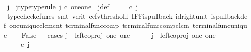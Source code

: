 \begin{isabellebody}
\ j\ \ j{\isacharunderscore}{\kern0pt}type{\isacharbrackleft}{\kern0pt}type{\isacharunderscore}{\kern0pt}rule{\isacharbrackright}{\kern0pt}{\isacharcolon}{\kern0pt}\ {\isachardoublequoteopen}j\ {\isasymin}\isactrlsub c\ one{\isasymCoprod}one{\isachardoublequoteclose}\ \ j{\isacharunderscore}{\kern0pt}def{\isacharcolon}{\kern0pt}\ \ {\isachardoublequoteopen}{\isacharparenleft}{\kern0pt}{\isasymlangle}{\isasymt}{\isacharcomma}{\kern0pt}\ {\isasymt}{\isasymrangle}\ {\isasymamalg}{\isasymlangle}{\isasymf}{\isacharcomma}{\kern0pt}\ {\isasymf}{\isasymrangle}{\isacharparenright}{\kern0pt}\ {\isasymcirc}\isactrlsub c\ j\ \ {\isacharequal}{\kern0pt}\ {\isasymlangle}{\isasymf}{\isacharcomma}{\kern0pt}{\isasymt}{\isasymrangle}{\isachardoublequoteclose}\isanewline
\ \ \ \ \isamarkupfalse%
\ {\isacharparenleft}{\kern0pt}typecheck{\isacharunderscore}{\kern0pt}cfuncs{\isacharcomma}{\kern0pt}\ smt\ {\isacharparenleft}{\kern0pt}verit{\isacharcomma}{\kern0pt}\ ccfv{\isacharunderscore}{\kern0pt}threshold{\isacharparenright}{\kern0pt}\ IFF{\isacharunderscore}{\kern0pt}is{\isacharunderscore}{\kern0pt}pullback\ id{\isacharunderscore}{\kern0pt}right{\isacharunderscore}{\kern0pt}unit{}\ is{\isacharunderscore}{\kern0pt}pullback{\isacharunderscore}{\kern0pt}def\ one{\isacharunderscore}{\kern0pt}unique{\isacharunderscore}{\kern0pt}element\ terminal{\isacharunderscore}{\kern0pt}func{\isacharunderscore}{\kern0pt}comp\ terminal{\isacharunderscore}{\kern0pt}func{\isacharunderscore}{\kern0pt}comp{\isacharunderscore}{\kern0pt}elem\ terminal{\isacharunderscore}{\kern0pt}func{\isacharunderscore}{\kern0pt}unique{\isacharparenright}{\kern0pt}\isanewline
\ \ \isamarkupfalse%
\ False\isanewline
\ \ \isamarkupfalse%
{\isacharparenleft}{\kern0pt}cases\ {\isachardoublequoteopen}j\ {\isacharequal}{\kern0pt}\ left{\isacharunderscore}{\kern0pt}coproj\ one\ one{\isachardoublequoteclose}{\isacharparenright}{\kern0pt}\isanewline
\ \ \ \ \isamarkupfalse%
\ {\isachardoublequoteopen}j\ {\isacharequal}{\kern0pt}\ left{\isacharunderscore}{\kern0pt}coproj\ one\ one{\isachardoublequoteclose}\isanewline
\ \ \ \ \isamarkupfalse%
\ \isamarkupfalse%
\ {\isachardoublequoteopen}{\isacharparenleft}{\kern0pt}{\isasymlangle}{\isasymt}{\isacharcomma}{\kern0pt}\ {\isasymt}{\isasymrangle}\ {\isasymamalg}{\isasymlangle}{\isasymf}{\isacharcomma}{\kern0pt}\ {\isasymf}{\isasymrangle}{\isacharparenright}{\kern0pt}\ {\isasymcirc}\isactrlsub c\ j\ \ {\isacharequal}{\kern0pt}\ {\isasymlangle}{\isasymt}{\isacharcomma}{\kern0pt}\ {\isasymt}{\isasymrangle}{\isachardoublequoteclose}\isanewline

\end{isabellebody}
